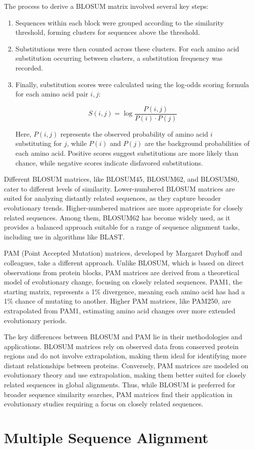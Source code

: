 The process to derive a BLOSUM matrix involved several key steps:
\begin{enumerate}
    \item Sequences within each block were grouped according to the similarity threshold, forming clusters for sequences above the threshold.
    \item Substitutions were then counted across these clusters. For each amino acid substitution occurring between clusters, a substitution frequency was recorded.
    \item Finally, substitution scores were calculated using the log-odds scoring formula for each amino acid pair $i, j$:
    
    \begin{equation}
    S(i, j) = \log \frac{P(i, j)}{P(i) \cdot P(j)}
    \end{equation}
    
    Here, $P(i, j)$ represents the observed probability of amino acid $i$ substituting for $j$, while $P(i)$ and $P(j)$ are the background probabilities of each amino acid. Positive scores suggest substitutions are more likely than chance, while negative scores indicate disfavored substitutions.
\end{enumerate}

Different BLOSUM matrices, like BLOSUM45, BLOSUM62, and BLOSUM80, cater to different levels of similarity. Lower-numbered BLOSUM matrices are suited for analyzing distantly related sequences, as they capture broader evolutionary trends. Higher-numbered matrices are more appropriate for closely related sequences. Among them, BLOSUM62 has become widely used, as it provides a balanced approach suitable for a range of sequence alignment tasks, including use in algorithms like BLAST.

PAM (Point Accepted Mutation) matrices, developed by Margaret Dayhoff and colleagues, take a different approach. Unlike BLOSUM, which is based on direct observations from protein blocks, PAM matrices are derived from a theoretical model of evolutionary change, focusing on closely related sequences. PAM1, the starting matrix, represents a 1\% divergence, meaning each amino acid has had a 1\% chance of mutating to another. Higher PAM matrices, like PAM250, are extrapolated from PAM1, estimating amino acid changes over more extended evolutionary periods.

The key differences between BLOSUM and PAM lie in their methodologies and applications. BLOSUM matrices rely on observed data from conserved protein regions and do not involve extrapolation, making them ideal for identifying more distant relationships between proteins. Conversely, PAM matrices are modeled on evolutionary theory and use extrapolation, making them better suited for closely related sequences in global alignments. Thus, while BLOSUM is preferred for broader sequence similarity searches, PAM matrices find their application in evolutionary studies requiring a focus on closely related sequences.

\section{Multiple Sequence Alignment}

